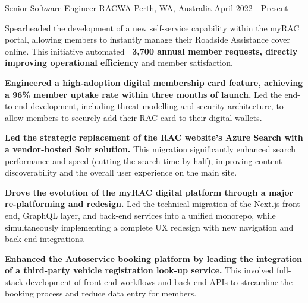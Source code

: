 

\begin{cventries}

  \cventry
    {Senior Software Engineer} %
    {RACWA} %
    {Perth, WA, Australia} %
    {April 2022 - Present} %
    {
      \begin{cvitems} %
        \item {Spearheaded the development of a new self-service capability within the myRAC portal, allowing members to instantly manage their Roadside Assistance cover online. This initiative automated \textbf{~3,700 annual member requests, directly improving operational efficiency} and member satisfaction.}
        \item {\textbf{Engineered a high-adoption digital membership card feature, achieving a 96\% member uptake rate within three months of launch.} Led the end-to-end development, including threat modelling and security architecture, to allow members to securely add their RAC card to their digital wallets.}
        \item {\textbf{Led the strategic replacement of the RAC website's Azure Search with a vendor-hosted Solr solution.} This migration significantly enhanced search performance and speed (cutting the search time by half), improving content discoverability and the overall user experience on the main site.}
        \item {\textbf{Drove the evolution of the myRAC digital platform through a major re-platforming and redesign.} Led the technical migration of the Next.js front-end, GraphQL layer, and back-end services into a unified monorepo, while simultaneously implementing a complete UX redesign with new navigation and back-end integrations.}
        \item {\textbf{Enhanced the Autoservice booking platform by leading the integration of a third-party vehicle registration look-up service.} This involved full-stack development of front-end workflows and back-end APIs to streamline the booking process and reduce data entry for members.}

\end{cvitems}}
\end{cventries}
